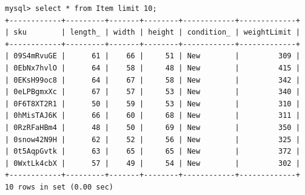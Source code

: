 \documentclass[american,extrafontsizes,12pt,portrait,letterpaper,oneside,onecolumn,final]{memoir}
\begin{document}
\begin{verbatim}
mysql> select * from Item limit 10;
+------------+---------+-------+--------+------------+-------------+
| sku        | length_ | width | height | condition_ | weightLimit |
+------------+---------+-------+--------+------------+-------------+
| 09S4mRvuGE |      61 |    66 |     51 | New        |         309 |
| 0EbNx7hvlO |      64 |    58 |     48 | New        |         415 |
| 0EKsH99oc8 |      64 |    67 |     58 | New        |         342 |
| 0eLPBgmxXc |      67 |    57 |     53 | New        |         340 |
| 0F6T8XT2R1 |      50 |    59 |     53 | New        |         310 |
| 0hMisTAJ6K |      66 |    60 |     68 | New        |         311 |
| 0RzRFaHBm4 |      48 |    50 |     69 | New        |         350 |
| 0snow42N9H |      62 |    52 |     56 | New        |         325 |
| 0t5AqpGvtk |      63 |    65 |     65 | New        |         372 |
| 0WxtLk4cbX |      57 |    49 |     54 | New        |         302 |
+------------+---------+-------+--------+------------+-------------+
10 rows in set (0.00 sec)


\end{verbatim}
\end{document}
